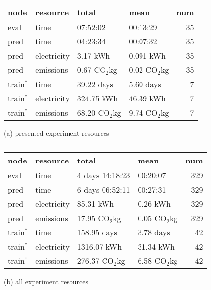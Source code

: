 \documentclass[10pt,twocolumn,letterpaper]{article}
\newcommand{\cotwo}{\ensuremath{\mathrm{CO_2}}}
\begin{document}
\begin{table}[t]
    \centering
\begin{tabular}{llllr}
\toprule
        node & resource &           total &            mean &  num \\
\midrule
eval        & time         & 07:52:02       &  00:13:29       &   35 \\
\midrule
pred        & time         & 04:23:34       &  00:07:32       &   35 \\
pred        & electricity  & 3.17 kWh       &  0.091 kWh      &   35 \\
pred        & emissions    & 0.67 \cotwo kg &  0.02 \cotwo kg &   35 \\
\midrule
train$^{*}$ & time         & 39.22 days      & 5.60 days      &   7 \\
train$^{*}$ & electricity  & 324.75 kWh      & 46.39 kWh      &   7 \\
train$^{*}$ & emissions    & 68.20 \cotwo kg & 9.74 \cotwo kg &   7 \\
\bottomrule
\end{tabular}
(a) presented experiment resources
\begin{tabular}{llllr}
\toprule
        node & resource &           total &            mean &  num \\
\midrule
eval        & time        & 4 days 14:18:23 & 00:20:07       &  329 \\
\midrule
pred        & time        & 6 days 06:52:11 & 00:27:31       &  329 \\
pred        & electricity & 85.31 kWh       & 0.26 kWh       &  329 \\
pred        & emissions   & 17.95 \cotwo kg & 0.05 \cotwo kg &  329 \\
\midrule
train$^{*}$ & time        & 158.95 days      &     3.78 days  &   42 \\
train$^{*}$ & electricity & 1316.07 kWh      &     31.34 kWh  &   42 \\
train$^{*}$ & emissions   & 276.37 \cotwo kg & 6.58 \cotwo kg &   42 \\
\bottomrule
\end{tabular}
(b) all experiment resources
\label{tab:resources}
\caption[]{
}
\end{table}
\end{document}

